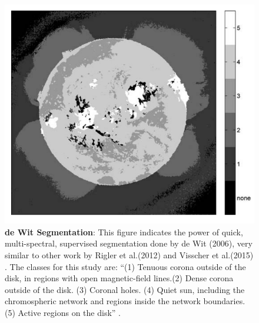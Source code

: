 \documentclass[twoside]{report}
\begin{document}
\begin{figure}[ht]
  \begin{center}
    \includegraphics[scale=1]{dewit.png}
    \caption{{\bf de Wit Segmentation}: This figure indicates the power of quick, multi-spectral, supervised segmentation done by de Wit (2006), very similar to other work by Rigler et al.(2012) and Visscher et al.(2015) \cite{dewit:2006}. The classes for this study are: ``(1) Tenuous corona outside of the disk, in regions with open magnetic-field lines.(2) Dense corona outside of the disk. (3) Coronal holes. (4) Quiet sun, including the chromospheric network and regions inside the network boundaries. (5) Active regions on the disk'' \cite{dewit:2006}. }
    \label{fig:dewit}
 \end{center}
\end{figure}
\end{document}
